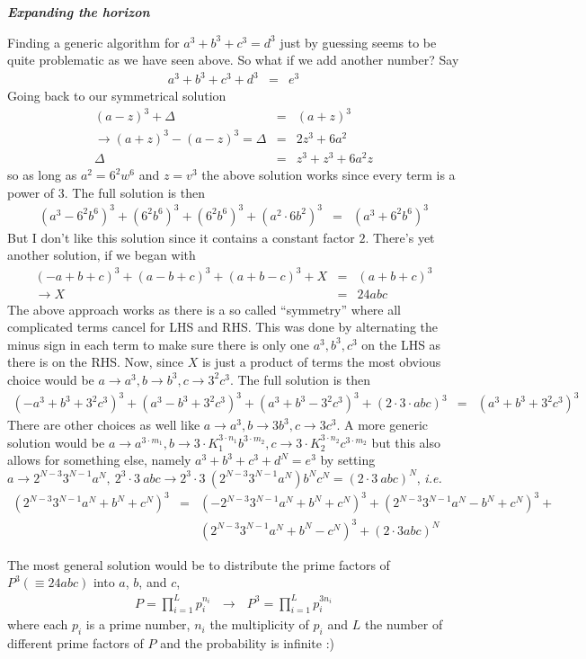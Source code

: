 \documentclass[aps,preprint,preprintnumbers,nofootinbib,showpacs,prd]{revtex4-1}
\newcommand{\ie}{{\it i.e.} }
\newcommand{\nbea}{\begin{eqnarray*}}
\newcommand{\neea}{\end{eqnarray*}}
\begin{document}
\bigskip\textbf{\textit{Expanding the horizon}}

Finding a generic algorithm for $a^3 + b^3 + c^3 = d^3$ just by guessing seems to be quite problematic as we have seen above. So what if we add another number? Say
%
\nbea
a^3 + b^3 + c^3 + d^3 & = & e^3
\neea
%
Going back to our symmetrical solution
%
\nbea
(a-z)^3 + \Delta & = & (a+z)^3 \\
\rightarrow (a+z)^3 - (a-z)^3 = \Delta & = & 2z^3 + 6a^2 \\
\Delta & = & z^3 + z^3 + 6a^2 z
\neea
%
so as long as $a^2 = 6^2 w^6$ and $z = v^3$ the above solution works since every term is a power of 3. The full solution is then
%
\nbea
(a^3 - 6^2 b^6)^3 + (6^2 b^6)^3 + (6^2 b^6)^3 + (a^2 \cdot 6 b^2)^3  & = & (a^3 + 6^2 b^6)^3
\neea
%
But I don't like this solution since it contains a constant factor $2$. There's yet another solution, if we began with
%
\nbea
(-a+b+c)^3 + (a-b+c)^3 + (a+b-c)^3 + X & = & (a+b+c)^3\\
\rightarrow X & = & 24 a b c
\neea
%
The above approach works as there is a so called ``symmetry'' where all complicated terms cancel for LHS and RHS. This was done by alternating the minus sign in each term to make sure there is only one $a^3, b^3, c^3$ on the LHS as there is on the RHS. Now, since $X$ is just a product of terms the most obvious choice would be $a \rightarrow a^3, b \rightarrow b^3, c \rightarrow 3^2 c^3$. The full solution is then
%
\nbea
(-a^3 + b^3 + 3^2 c^3)^3 + (a^3 - b^3 + 3^2 c^3)^3 + (a^3 + b^3 - 3^2 c^3)^3 + (2 \cdot 3 \cdot a b c)^3  & = & (a^3 + b^3 + 3^2 c^3)^3
\neea
%
There are other choices as well like $a \rightarrow a^3, b \rightarrow 3 b^3, c \rightarrow 3 c^3$. A more generic solution would be $a \rightarrow a^{3 \cdot m_1}, b \rightarrow 3 \cdot K_1^{3 \cdot n_1} b^{3 \cdot m_2}, c \rightarrow 3 \cdot K_2^{3 \cdot n_2} c^{3 \cdot m_2}$ but this also allows for something else, namely $a^3 + b^3 + c^3 + d^N = e^3$ by setting $a \rightarrow 2^{N-3} 3^{N-1} a^{N},~2^3 \cdot 3~ abc \rightarrow 2^3 \cdot 3~ (2^{N-3} 3^{N-1} a^{N}) b^{N} c^{N}  = (2 \cdot 3~abc)^N$, \ie
%
\nbea
(2^{N-3} 3^{N-1} a^{N} + b^N + c^N)^3 & = & (-2^{N-3} 3^{N-1} a^{N} + b^N + c^N)^3 + (2^{N-3} 3^{N-1} a^{N} - b^N + c^N)^3 + \\
&& (2^{N-3} 3^{N-1} a^{N} + b^N - c^N)^3 + (2 \cdot 3 a b c)^N
\neea
%

The most general solution would be to distribute the prime factors of $P^3 (\equiv 24 abc)$ into $a$, $b$, and $c$,
%
\nbea
P = \prod_{i=1}^{L} p_i^{n_i} ~~~\longrightarrow~~~ P^3 = \prod_{i=1}^{L} p_i^{3 n_i}
\neea
%
where each $p_i$ is a prime number, $n_i$ the multiplicity of $p_i$ and $L$ the number of different prime factors of $P$ and the probability is infinite :)
\end{document}
